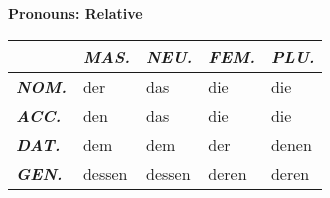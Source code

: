 \documentclass[a4paper,twocolumn,10pt]{article}
\newcommand{\tabularxtable}[3]
{

	\vspace{0.5cm}
	\nolinenumbers

	\begin{tabularx}{#1}{#2}
		#3
	\end{tabularx}

	\linenumbers
	\vspace{0.5cm}
}
\begin{document}
\textbf {Pronouns: Relative}
\tabularxtable
{0.99\linewidth}
{l|XXXX}
{

		&
		\cellcolor{table-subtopic} \textbf{\textit{MAS.}}  &
		\cellcolor{table-subtopic} \textbf{\textit{NEU.}}  &
		\cellcolor{table-subtopic} \textbf{\textit{FEM.}}  &
		\cellcolor{table-subtopic} \textbf{\textit{PLU.}} \\

		\midrule

		\cellcolor{table-subtopic} \textbf{\textit{NOM.}} &
		\cellcolor{cell-lightpurple}  der            &
		\cellcolor{cell-lightorange}  das            &
		\cellcolor{cell-lightblue}    die            &
		\cellcolor{cell-lightblue}    die \\

		\cellcolor{table-subtopic} \textbf{\textit{ACC.}} &
		\cellcolor{cell-lightgreen}   den            &
		\cellcolor{cell-lightorange}  das            &
		\cellcolor{cell-lightblue}    die            &
		\cellcolor{cell-lightblue}    die \\

		\cellcolor{table-subtopic} \textbf{\textit{DAT.}} &
		\cellcolor{cell-lightred}    dem             &
		\cellcolor{cell-lightred}    dem             &
		\cellcolor{cell-lightpurple} der             &
		\cellcolor{cell-lightgreen}  denen \\

		\cellcolor{table-subtopic} \textbf{\textit{GEN.}} &
		\cellcolor{cell-lightyellow} dessen               &
		\cellcolor{cell-lightyellow} dessen               &
		\cellcolor{cell-lightpurple} deren               &
		\cellcolor{cell-lightpurple} deren \\

}


\end{document}

